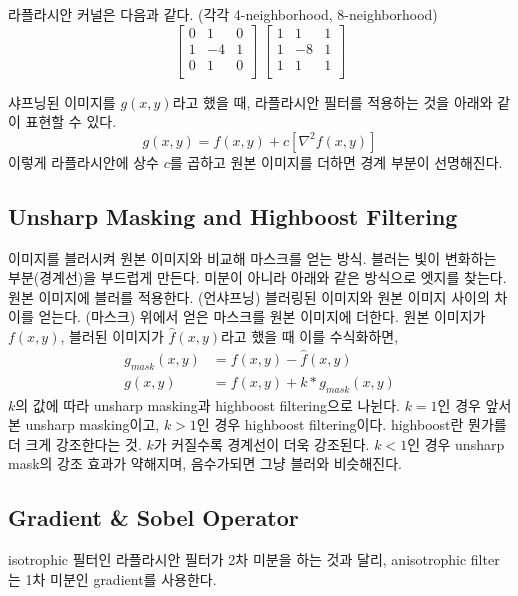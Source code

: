 라플라시안 커널은 다음과 같다. (각각 4-neighborhood, 8-neighborhood)
$$
\begin{bmatrix}
  0 & 1 & 0 \\
  1 & -4 & 1 \\
  0 & 1 & 0 \\
\end{bmatrix}
\;
\begin{bmatrix}
  1 & 1 & 1 \\
  1 & -8 & 1 \\
  1 & 1 & 1 \\
\end{bmatrix}
$$

샤프닝된 이미지를 $g(x, y)$라고 했을 때, 라플라시안 필터를 적용하는 것을 아래와 같이 표현할 수 있다.
$$g(x, y) = f(x, y) + c[\nabla^2 f(x, y)]$$
이렇게 라플라시안에 상수 $c$를 곱하고 원본 이미지를 더하면 경계 부분이 선명해진다.

\subsection{Unsharp Masking and Highboost Filtering}

이미지를 블러시켜 원본 이미지와 비교해 마스크를 얻는 방식. 블러는 빛이 변화하는 부분(경계선)을 부드럽게 만든다. 미분이 아니라 아래와 같은 방식으로 엣지를 찾는다.
\benum
  \itm 원본 이미지에 블러를 적용한다. (언샤프닝)
  \itm 블러링된 이미지와 원본 이미지 사이의 차이를 얻는다. (마스크)
  \itm 위에서 얻은 마스크를 원본 이미지에 더한다.
\eenum
원본 이미지가 $f(x, y)$, 블러된 이미지가 $\hat{f}(x, y)$라고 했을 때 이를 수식화하면,
$$
\begin{aligned}
  g_{mask}(x, y) &= f(x, y) - \hat{f}(x, y) \\
  g(x, y) &= f(x, y) + k \ast g_{mask}(x, y)
\end{aligned}
$$
$k$의 값에 따라 unsharp masking과 highboost filtering으로 나뉜다. $k = 1$인 경우 앞서 본 unsharp masking이고, $k > 1$인 경우 highboost filtering이다. highboost란 뭔가를 더 크게 강조한다는 것. $k$가 커질수록 경계선이 더욱 강조된다. $k < 1$인 경우 unsharp mask의 강조 효과가 약해지며, 음수가되면 그냥 블러와 비슷해진다.

\subsection{Gradient \& Sobel Operator}

isotrophic 필터인 라플라시안 필터가 2차 미분을 하는 것과 달리, anisotrophic filter는 1차 미분인 gradient를 사용한다.


